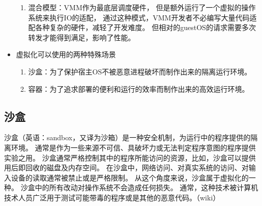 \documentclass[AutoFakeBold,a4paper]{ctexart}
\begin{document}
\begin{itemize}
\begin{enumerate}
        \item 混合模型：VMM作为最底层调度硬件，
        但是额外运行了一个虚拟的操作系统来执行IO的适配，
        通过这种模式，VMM开发者不必编写大量代码适配各种复杂的硬件，减轻了开发难度。
        但相对的guestOS的请求需要多次转发才能得到满足，影响了性能。
    \end{enumerate}
    \item 虚拟化可以使用的两种特殊场景
    \begin{enumerate}
        \item 沙盒：为了保护宿主OS不被恶意进程破坏而制作出来的隔离运行环境。
        \item 容器：为了追求部署的便利和运行的效率而制作出来的高效运行环境。
    \end{enumerate}
\end{itemize}

\subsection{沙盒}
沙盒（英语：sandbox，又译为沙箱）是一种安全机制，为运行中的程序提供的隔离环境。
通常是作为一些来源不可信、具破坏力或无法判定程序意图的程序提供实验之用。
沙盒通常严格控制其中的程序所能访问的资源，比如，沙盒可以提供用后即回收的磁盘及内存空间。
在沙盒中，网络访问、对真实系统的访问、对输入设备的读取通常被禁止或是严格限制。
从这个角度来说，沙盒属于虚拟化的一种。
沙盒中的所有改动对操作系统不会造成任何损失。
通常，这种技术被计算机技术人员广泛用于测试可能带毒的程序或是其他的恶意代码。（wiki）
\end{document}
